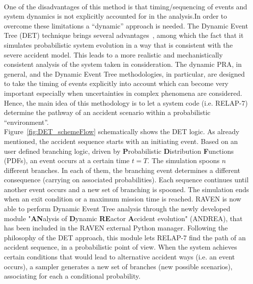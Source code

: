 \documentclass{mc2013}
\begin{document}
\\One of the disadvantages of this method is that timing/sequencing of events and system dynamics is not explicitly accounted for in the analysis.In order to overcome these limitations a ``dynamic'' approach is needed. The Dynamic Event Tree (DET) technique brings several advantages~\cite{ADAPTHakobyan}, among which the fact that it simulates probabilistic system evolution in a way that is consistent with the severe accident model. This leads to a more realistic and mechanistically consistent analysis of the system taken in consideration. The dynamic PRA, in general, and the Dynamic Event Tree methodologies, in particular, are designed to take the timing of events explicitly into account which can become very important especially when uncertainties in complex phenomena are considered. Hence, the main idea of this methodology is to let a system code (i.e. RELAP-7) determine the pathway of an accident scenario within a probabilistic ``environment''. \\ Figure~\ref{fig:DET_schemeFlow} schematically shows the DET logic. As already mentioned, the accident sequence starts with an initiating event. Based on an user defined branching logic, driven by \textbf{P}robabilistic \textbf{D}istribution \textbf{F}unctions (PDFs), an event occurs at a certain time $t=T$. The simulation spoons $n$ different branches. In each of them, the branching event determines a different consequence (carrying on associated probabilities). Each sequence continues until another event occurs and a new set of branching is spooned. The simulation ends when an exit condition or a maximum mission time is reached.    
\label{sec:DETRavenApproach}
RAVEN is now able to perform Dynamic Event Tree analysis through the newly developed module "\textbf{AN}alysis of \textbf{D}ynamic \textbf{RE}actor \textbf{A}ccident evolution" (ANDREA), that has been included in the RAVEN external Python manager. Following the philosophy of the DET approach, this module lets RELAP-7 find the path of an accident sequence, in a probabilistic point of view. When the system achieves certain conditions that would lead to alternative accident ways (i.e. an event occurs), a sampler generates a new set of branches (new possible scenarios), associating for each a conditional probability.  
\end{document}
